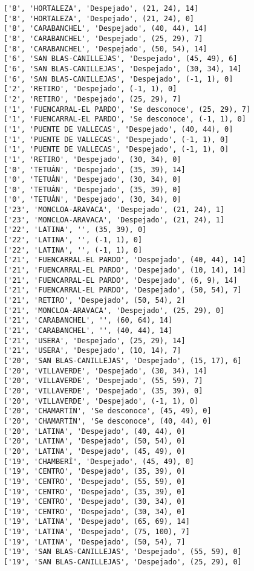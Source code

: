 \documentclass[11pt]{article}
\begin{document}
\begin{Verbatim}[commandchars=\\\{\}]
['8', 'HORTALEZA', 'Despejado', (21, 24), 14]
['8', 'HORTALEZA', 'Despejado', (21, 24), 0]
['8', 'CARABANCHEL', 'Despejado', (40, 44), 14]
['8', 'CARABANCHEL', 'Despejado', (25, 29), 7]
['8', 'CARABANCHEL', 'Despejado', (50, 54), 14]
['6', 'SAN BLAS-CANILLEJAS', 'Despejado', (45, 49), 6]
['6', 'SAN BLAS-CANILLEJAS', 'Despejado', (30, 34), 14]
['6', 'SAN BLAS-CANILLEJAS', 'Despejado', (-1, 1), 0]
['2', 'RETIRO', 'Despejado', (-1, 1), 0]
['2', 'RETIRO', 'Despejado', (25, 29), 7]
['1', 'FUENCARRAL-EL PARDO', 'Se desconoce', (25, 29), 7]
['1', 'FUENCARRAL-EL PARDO', 'Se desconoce', (-1, 1), 0]
['1', 'PUENTE DE VALLECAS', 'Despejado', (40, 44), 0]
['1', 'PUENTE DE VALLECAS', 'Despejado', (-1, 1), 0]
['1', 'PUENTE DE VALLECAS', 'Despejado', (-1, 1), 0]
['1', 'RETIRO', 'Despejado', (30, 34), 0]
['0', 'TETUÁN', 'Despejado', (35, 39), 14]
['0', 'TETUÁN', 'Despejado', (30, 34), 0]
['0', 'TETUÁN', 'Despejado', (35, 39), 0]
['0', 'TETUÁN', 'Despejado', (30, 34), 0]
['23', 'MONCLOA-ARAVACA', 'Despejado', (21, 24), 1]
['23', 'MONCLOA-ARAVACA', 'Despejado', (21, 24), 1]
['22', 'LATINA', '', (35, 39), 0]
['22', 'LATINA', '', (-1, 1), 0]
['22', 'LATINA', '', (-1, 1), 0]
['21', 'FUENCARRAL-EL PARDO', 'Despejado', (40, 44), 14]
['21', 'FUENCARRAL-EL PARDO', 'Despejado', (10, 14), 14]
['21', 'FUENCARRAL-EL PARDO', 'Despejado', (6, 9), 14]
['21', 'FUENCARRAL-EL PARDO', 'Despejado', (50, 54), 7]
['21', 'RETIRO', 'Despejado', (50, 54), 2]
['21', 'MONCLOA-ARAVACA', 'Despejado', (25, 29), 0]
['21', 'CARABANCHEL', '', (60, 64), 14]
['21', 'CARABANCHEL', '', (40, 44), 14]
['21', 'USERA', 'Despejado', (25, 29), 14]
['21', 'USERA', 'Despejado', (10, 14), 7]
['20', 'SAN BLAS-CANILLEJAS', 'Despejado', (15, 17), 6]
['20', 'VILLAVERDE', 'Despejado', (30, 34), 14]
['20', 'VILLAVERDE', 'Despejado', (55, 59), 7]
['20', 'VILLAVERDE', 'Despejado', (35, 39), 0]
['20', 'VILLAVERDE', 'Despejado', (-1, 1), 0]
['20', 'CHAMARTÍN', 'Se desconoce', (45, 49), 0]
['20', 'CHAMARTÍN', 'Se desconoce', (40, 44), 0]
['20', 'LATINA', 'Despejado', (40, 44), 0]
['20', 'LATINA', 'Despejado', (50, 54), 0]
['20', 'LATINA', 'Despejado', (45, 49), 0]
['19', 'CHAMBERÍ', 'Despejado', (45, 49), 0]
['19', 'CENTRO', 'Despejado', (35, 39), 0]
['19', 'CENTRO', 'Despejado', (55, 59), 0]
['19', 'CENTRO', 'Despejado', (35, 39), 0]
['19', 'CENTRO', 'Despejado', (30, 34), 0]
['19', 'CENTRO', 'Despejado', (30, 34), 0]
['19', 'LATINA', 'Despejado', (65, 69), 14]
['19', 'LATINA', 'Despejado', (75, 100), 7]
['19', 'LATINA', 'Despejado', (50, 54), 7]
['19', 'SAN BLAS-CANILLEJAS', 'Despejado', (55, 59), 0]
['19', 'SAN BLAS-CANILLEJAS', 'Despejado', (25, 29), 0]

\end{Verbatim}
\end{document}
